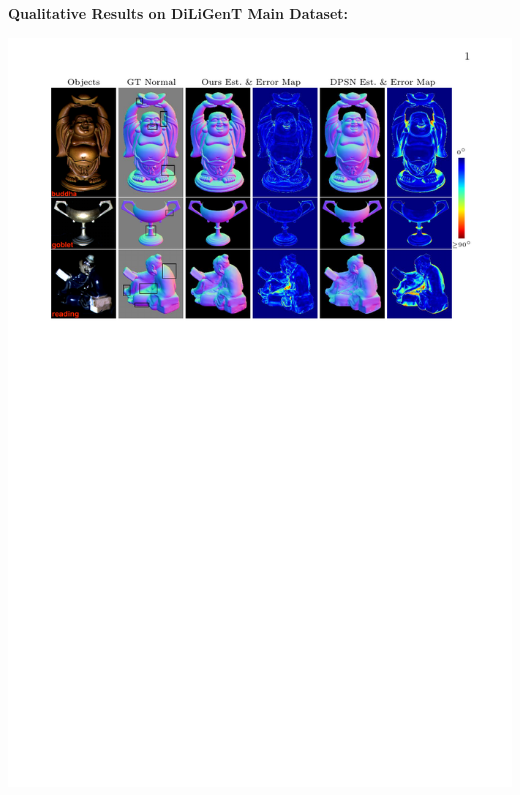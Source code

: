 \documentclass[a0paper,landscape]{baposter}
\begin{document}
\begin{poster}
{\begin{minipage}[t]{0.525\textwidth}
        \end{minipage}
        \hfill
        \begin{minipage}[t]{0.465\textwidth}
        \textbf{\color{blue}Qualitative Results on DiLiGenT Main Dataset:} 
            \begin{center}
                \vspace{-0.5em}
                \includegraphics[width=\textwidth]{images/res_qual_diligent_main}
            \end{center}
        \end{minipage}

}
\end{poster}
\end{document}
